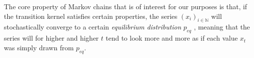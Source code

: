 The core property of Markov chains that is of interest for our purposes is that, if the transition kernel satisfies certain properties, the series $(x_i)_{i \in \mathbb{N}}$ will stochastically converge to a certain \textit{equilibrium distribution} $p_{eq}$ \cite{bonawitz2008composable}, meaning that the series will for higher and higher $t$ tend to look more and more as if each value $x_t$ was simply drawn from $p_{eq}$.
